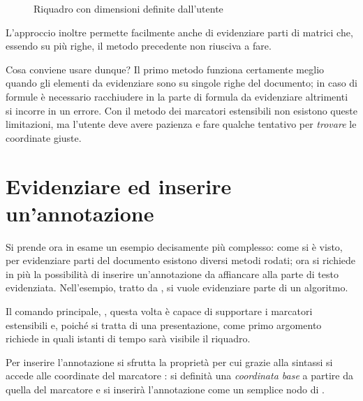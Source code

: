 \begin{figure}[ht]
\centering
{}
\caption{Riquadro con dimensioni definite dall'utente}
\label{fig:hf-tikz}
\end{figure}

L'approccio inoltre permette facilmente anche di evidenziare parti di matrici che, essendo su più righe, il metodo precedente non riusciva a fare.

Cosa conviene usare dunque? Il primo metodo funziona certamente meglio quando gli elementi da evidenziare sono su singole righe del documento; in caso di formule è necessario racchiudere in  la parte di formula da evidenziare altrimenti si incorre in un errore. Con il metodo dei marcatori estensibili non esistono queste limitazioni, ma l'utente deve avere pazienza e fare qualche tentativo per \emph{trovare} le coordinate giuste.

\section{Evidenziare ed inserire un'annotazione}
Si prende ora in esame un esempio decisamente più complesso: come si è visto, per evidenziare parti del documento esistono diversi metodi rodati; ora si richiede in più la possibilità di inserire un'annotazione da affiancare alla parte di testo evidenziata. Nell'esempio, tratto da , si vuole evidenziare parte di un algoritmo.

Il comando principale, , questa volta è capace di supportare i marcatori estensibili e, poiché si tratta di una presentazione, come primo argomento richiede in quali istanti di tempo sarà visibile il riquadro.

Per inserire l'annotazione si sfrutta la proprietà per cui grazie alla sintassi  si accede alle coordinate del marcatore : si definità una \emph{coordinata base} a partire da quella del marcatore e si inserirà l'annotazione come un semplice nodo di \Tikz{}.

